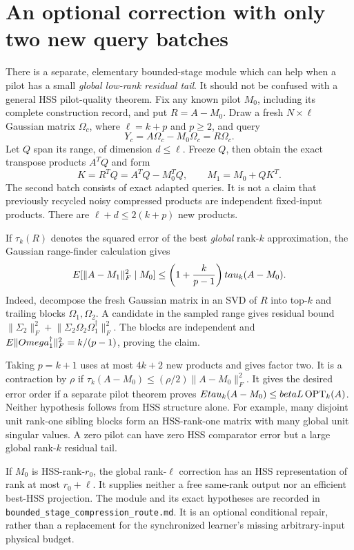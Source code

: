 \documentclass[11pt,oneside,openany,a4paper]{report}
\numberwithin{equation}{chapter}
\theoremstyle{definition}
\theoremstyle{remark}
\newcommand{\sourcefile}[1]{{\small\nolinkurl{#1}}}
\begin{document}
\section{An optional correction with only two new query batches}

There is a separate, elementary bounded-stage module which can help
when a pilot has a small \emph{global low-rank residual tail}.  It
should not be confused with a general HSS pilot-quality theorem.
Fix any known pilot $M_0$, including its complete construction record,
and put $R=A-M_0$.  Draw a fresh $N\times\ell$ Gaussian matrix
$\Omega_c$, where $\ell=k+p$ and $p\geq2$, and query
\[
 Y_c=A\Omega_c-M_0\Omega_c=R\Omega_c.
\]
Let $Q$ span its range, of dimension $d\leq\ell$.  Freeze $Q$, then
obtain the exact transpose products $A^TQ$ and form
\[
 K=R^TQ=A^TQ-M_0^TQ,
 \qquad M_1=M_0+QK^T.
\]
The second batch consists of exact adapted queries.  It is not a claim
that previously recycled noisy compressed products are independent
fixed-input products.  There are $\ell+d\leq2(k+p)$ new products.

If $\tau_k(R)$ denotes the squared error of the best \emph{global}
rank-$k$ approximation, the Gaussian range-finder calculation gives
\begin{equation}
 E[\lVert A-M_1\rVert_F^2\mid M_0]
 \leq\left(1+\frac{k}{p-1}\right)tau_k(A-M_0).
 \label{eq:route-two-batch}
\end{equation}
Indeed, decompose the fresh Gaussian matrix in an SVD of $R$ into
top-$k$ and trailing blocks $\Omega_1,\Omega_2$.  A candidate in the
sampled range gives residual bound
$\lVert\Sigma_2\rVert_F^2+
 \lVert\Sigma_2\Omega_2\Omega_1^\dagger\rVert_F^2$.
The blocks are independent and
$E\lVert Omega_1^\dagger\rVert_F^2=k/(p-1)$, proving the claim.

Taking $p=k+1$ uses at most $4k+2$ new products and gives factor two.
It is a contraction by $\rho$ if
$\tau_k(A-M_0)\leq(\rho/2)\lVert A-M_0\rVert_F^2$.
It gives the desired error order if a separate pilot theorem proves
$Etau_k(A-M_0)\leq beta L\operatorname{OPT}_k(A)$.
Neither hypothesis follows from HSS structure alone.  For example,
many disjoint unit rank-one sibling blocks form an HSS-rank-one matrix
with many global unit singular values.  A zero pilot can have zero HSS
comparator error but a large global rank-$k$ residual tail.

If $M_0$ is HSS-rank-$r_0$, the global rank-$\ell$ correction has an
HSS representation of rank at most $r_0+\ell$.  It supplies neither a
free same-rank output nor an efficient best-HSS projection.  The module
and its exact hypotheses are recorded in
\sourcefile{bounded_stage_compression_route.md}.  It is an optional
conditional repair, rather than a replacement for the synchronized
learner's missing arbitrary-input physical budget.
\end{document}
